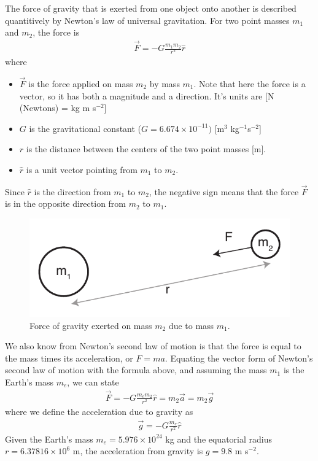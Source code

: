 \documentclass[11pt, oneside]{article}   	%
\begin{document}
 The force of gravity that is exerted from one object onto another is described quantitively by Newton's law of universal gravitation. For two point masses $m_1$ and $m_2$, the force is
\begin{eqnarray}
	 \overrightarrow{F}=-G{\frac {m_{1}m_{2}}{r^{2}}} \hat r
\end{eqnarray}
where 
\begin{itemize}
\item  $ \overrightarrow{F}$ is the force applied on mass $m_2$ by mass $m_1$. Note that here the force is a vector, so it has both a magnitude and a direction. It's units are [N (Newtons) = kg m s$^{-2}$]
\item $G$ is the gravitational constant ($G=6.674\times10^{-11})$ [m$^3$ kg$^{-1}$s$^{-2}$]
\item $r$ is the distance between the centers of the two point masses [m].
\item  $\hat r$ is a unit vector pointing from $m_1$ to $m_2$.
\end{itemize}
Since $\hat r$ is the direction from $m_1$ to $m_2$, the negative sign means that the force $ \overrightarrow{F}$ is in the opposite direction from $m_2$ to $m_1$.
%
\begin{figure}[htbp]
\begin{center}
\includegraphics{masses.pdf}
\caption{Force of gravity exerted on mass $m_2$ due to mass $m_1$.}
\label{default}
\end{center}
\end{figure}
%

We also know from Newton's second law of motion is that the force is equal to the mass times its acceleration, or $F = ma$.  Equating the vector form of Newton's second law of motion with the formula above, and assuming the mass $m_1$ is the Earth's mass $m_e$, we can state
\begin{eqnarray}
	 \overrightarrow{F}=-G{\frac {m_{e}m_{2}}{r^{2}}} \hat r = m_2  \overrightarrow{a} = m_2  \overrightarrow{g}
	 \label{eq:Fg}
\end{eqnarray}
where we define the acceleration due to gravity as
\begin{eqnarray}
	 \overrightarrow{g}=-G{\frac {m_{e} }{r^{2}}} \hat r  
\end{eqnarray}
Given the Earth's mass $m_e = 5.976 \times 10^{24}$ kg and the equatorial radius $ r= 6.37816 \times 10^6$ m,  the acceleration from gravity is $g= 9.8$ m s$^{-2}$.
\end{document}
